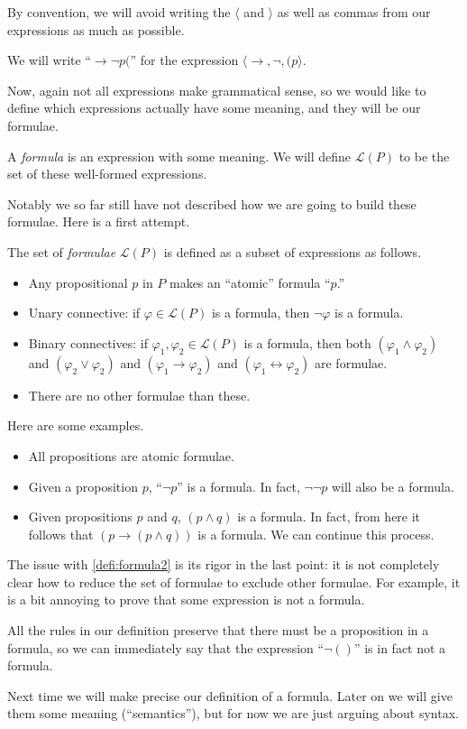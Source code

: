 By convention, we will avoid writing the $\langle$ and $\rangle$ as well as commas from our expressions as much as possible.
\begin{example}
	We will write ``$\to\lnot p($'' for the expression $\langle\to,\lnot,(p\rangle$.
\end{example}
Now, again not all expressions make grammatical sense, so we would like to define which expressions actually have some meaning, and they will be our formulae.
\begin{definition}[Formula, I]
	A \textit{formula} is an expression with some meaning. We will define $\mathcal L(P)$ to be the set of these well-formed expressions.
\end{definition}
Notably we so far still have not described how we are going to build these formulae. Here is a first attempt.
\begin{definition}[Formula, II] \label{defi:formula2}
	The set of \textit{formulae} $\mathcal L(P)$ is defined as a subset of expressions as follows.
	\begin{itemize}
		\item Any propositional $p$ in $P$ makes an ``atomic'' formula ``$p$.''
		\item Unary connective: if $\varphi\in\mathcal L(P)$ is a formula, then $\lnot\varphi$ is a formula.
		\item Binary connectives: if $\varphi_1,\varphi_2\in\mathcal L(P)$ is a formula, then both $(\varphi_1\land\varphi_2)$ and $(\varphi_2\lor\varphi_2)$ and $(\varphi_1\to\varphi_2)$ and $(\varphi_1\leftrightarrow\varphi_2)$ are formulae.
		\item There are no other formulae than these.
	\end{itemize}
\end{definition}
\begin{example}
	Here are some examples.
	\begin{itemize}
		\item All propositions are atomic formulae.
		\item Given a proposition $p$, ``$\lnot p$'' is a formula. In fact, $\lnot\lnot p$ will also be a formula.
		\item Given propositions $p$ and $q$, $(p\land q)$ is a formula. In fact, from here it follows that $(p\to(p\land q))$ is a formula. We can continue this process.
	\end{itemize}
\end{example}
The issue with \autoref{defi:formula2} is its rigor in the last point: it is not completely clear how to reduce the set of formulae to exclude other formulae. For example, it is a bit annoying to prove that some expression is not a formula.
\begin{example}
	All the rules in our definition preserve that there must be a proposition in a formula, so we can immediately say that the expression ``$\lnot()$'' is in fact not a formula.
\end{example}
Next time we will make precise our definition of a formula. Later on we will give them some meaning (``semantics''), but for now we are just arguing about syntax.